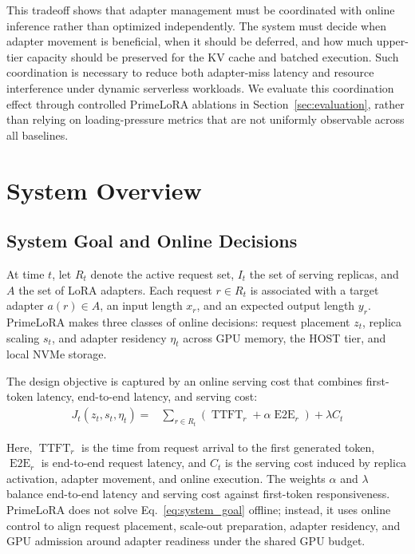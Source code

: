 \documentclass[lettersize,journal]{IEEEtran}
\begin{document}
This tradeoff shows that adapter management must be coordinated with online inference rather than optimized independently. The system must decide when adapter movement is beneficial, when it should be deferred, and how much upper-tier capacity should be preserved for the KV cache and batched execution. Such coordination is necessary to reduce both adapter-miss latency and resource interference under dynamic serverless workloads. We evaluate this coordination effect through controlled PrimeLoRA ablations in Section~\ref{sec:evaluation}, rather than relying on loading-pressure metrics that are not uniformly observable across all baselines.

\section{System Overview}

\subsection{System Goal and Online Decisions}

At time $t$, let $R_t$ denote the active request set, $I_t$ the set of serving replicas, and $A$ the set of LoRA adapters. Each request $r \in R_t$ is associated with a target adapter $a(r) \in A$, an input length $x_r$, and an expected output length $y_r$. PrimeLoRA makes three classes of online decisions: request placement $z_t$, replica scaling $s_t$, and adapter residency $\eta_t$ across GPU memory, the HOST tier, and local NVMe storage.

The design objective is captured by an online serving cost that combines first-token latency, end-to-end latency, and serving cost:
\begin{equation}
\begin{aligned}
J_t(z_t,s_t,\eta_t)
=& \sum_{r \in R_t}
\left(\operatorname{TTFT}_r
+ \alpha \operatorname{E2E}_r\right) + \lambda C_t 
\end{aligned}
\label{eq:system_goal}
\end{equation}

Here, $\operatorname{TTFT}_r$ is the time from request arrival to the first generated token, $\operatorname{E2E}_r$ is end-to-end request latency, and $C_t$ is the serving cost induced by replica activation, adapter movement, and online execution. The weights $\alpha$ and $\lambda$ balance end-to-end latency and serving cost against first-token responsiveness. PrimeLoRA does not solve Eq.~\ref{eq:system_goal} offline; instead, it uses online control to align request placement, scale-out preparation, adapter residency, and GPU admission around adapter readiness under the shared GPU budget.
\end{document}
